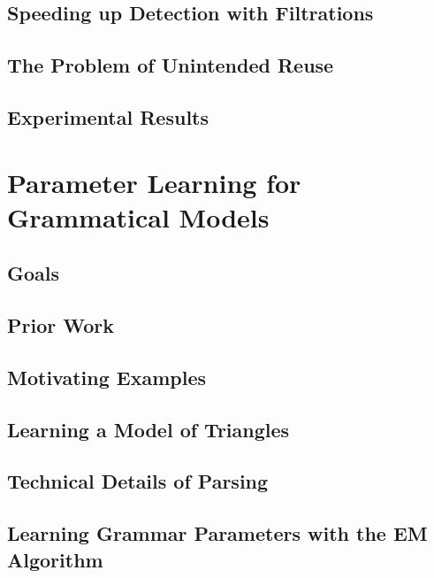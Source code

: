 \documentclass{tufte-book}
\begin{document}
  \section{Speeding up Detection with Filtrations}
    

  \section{The Problem of Unintended Reuse}

  \section{Experimental Results}
% 
% 
% 

\chapter{Parameter Learning for Grammatical Models}

  \section{Goals}
    

  \section{Prior Work}

  \section{Motivating Examples}

  \section{Learning a Model of Triangles}
    

  \section{Technical Details of Parsing}
  \section{Learning Grammar Parameters with the EM Algorithm}
\end{document}
